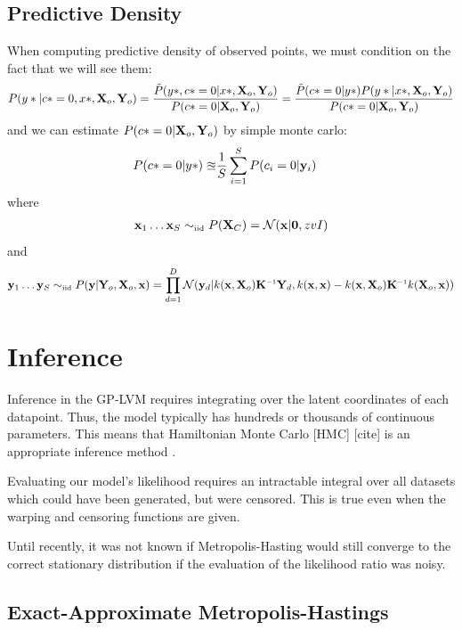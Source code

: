 \documentclass{article}
\begin{document}
\subsection{Predictive Density}

When computing predictive density of observed points, we must condition on the fact that we will see them:
%
\begin{align}
P(y* |c* = 0, x*, \mathbf{X}_o, \mathbf{Y}_o ) = \frac{\tilde{P}(y*, c* = 0 | x*, \mathbf{X}_o, \mathbf{Y}_o )}{ P(c* = 0 | \mathbf{X}_o, \mathbf{Y}_o)}
= \frac{\tilde{P}(c* = 0 | y* ) P(y* | x*, \mathbf{X}_o, \mathbf{Y}_o )}{ P(c* = 0 | \mathbf{X}_o, \mathbf{Y}_o)}
\end{align}
%
and we can estimate $P(c* = 0 | \mathbf{X}_o, \mathbf{Y}_o )$ by simple monte carlo:
%
\begin{align}
P(c* = 0 | y* ) \approxeq & \frac{1}{S} \sum_{i=1}^S P(c_i = 0 | {\bf{y}}_i )
\end{align}
%
where
%
\begin{align}
  \vx_1 \dots \vx_S \simiid P( \vX_C ) = \N{\vx}{ \vzero}{ zvI }
\end{align}
%
and
%
\begin{align}
 \vy_1 \dots \vy_S \simiid P(\vy | \vY_o, \vX_o, \vx) = \prod_{d=1}^D \N{\vy_d}{k(\vx, \vX_o) \vK\inv \vY_d}{k(\vx, \vx) - k(\vx, \vX_o) \vK\inv k(\vX_o, \vx)}
\end{align}

\section{Inference}

Inference in the GP-LVM requires integrating over the latent coordinates of each datapoint.  Thus, the model typically has hundreds or thousands of continuous parameters.  This means that Hamiltonian Monte Carlo [HMC] [cite] is an appropriate inference method \cite{IwaDuvGha2012warped}.  

Evaluating our model's likelihood requires an intractable integral over all datasets which could have been generated, but were censored.  This is true even when the warping and censoring functions are given.

Until recently, it was not known if Metropolis-Hasting would still converge to the correct stationary distribution if the evaluation of the likelihood ratio was noisy.

\subsection{Exact-Approximate Metropolis-Hastings}
\end{document}
